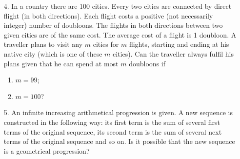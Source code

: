 \documentclass[11pt,a4paper]{article}
\begin{document}
\begin{enumerate}
	\item[4.]In a country there are 100 cities. Every two cities are connected by direct
	flight (in both directions). Each flight costs a positive (not necessarily integer)
	number of doubloons. The flights in both directions between two given cities
	are of the same cost. The average cost of a flight is 1 doubloon. A traveller
	plans to visit any $m$ cities for $m$ flights, starting and ending at his native city
	(which is one of these $m$ cities). Can the traveller always fulfil his plans given
	that he can spend at most $m$ doubloons if 
	\begin{enumerate}
		\item $m=99$;
		\item $m=100$?
	\end{enumerate}
    
    
    \item[5.] 
    An infinite increasing arithmetical progression is given. A new sequence is
    constructed in the following way: its first term is the sum of several first terms
    of the original sequence, its second term is the sum of several next terms of the
    original sequence and so on. Is it possible that the new sequence is a geometrical
    progression?
\end{enumerate}
\end{document}

